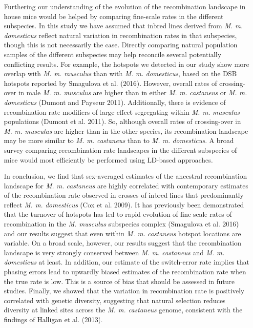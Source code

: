 	Furthering our understanding of the evolution of the recombination landscape in house mice would be helped by comparing fine-scale rates in the different subspecies. In this study we have assumed that inbred lines derived from \textit{M. m. domesticus} reflect natural variation in recombination rates in that subspecies, though this is not necessarily the case. Directly comparing natural population samples of the different subspecies may help reconcile several potentially conflicting results. For example, the hotspots we detected in our study show more overlap with \textit{M. m. musculus} than with \textit{M. m. domesticus}, based on the DSB hotspots reported by Smagulova et al. (2016). However, overall rates of crossing-over in male \textit{M. m. musculus} are higher than in either \textit{M. m. castaneus} or \textit{M. m. domesticus} (Dumont and Payseur 2011). Additionally, there is evidence of recombination rate modifiers of large effect segregating within \textit{M. m. musculus} populations (Dumont et al. 2011). So, although overall rates of crossing-over in \textit{M. m. musculus} are higher than in the other species, its recombination landscape may be more similar to \textit{M. m. castaneus} than to \textit{M. m. domesticus}. A broad survey comparing recombination rate landscapes in the different subspecies of mice would most efficiently be performed using LD-based approaches.  

In conclusion, we find that sex-averaged estimates of the ancestral recombination landscape for \textit{M. m. castaneus} are highly correlated with contemporary estimates of the recombination rate observed in crosses of inbred lines that predominantly reflect \textit{M. m. domesticus} (Cox et al. 2009). It has previously been demonstrated that the turnover of hotspots has led to rapid evolution of fine-scale rates of recombination in the \textit{M. musculus} subspecies complex (Smagulova et al. 2016) and our results suggest that even within \textit{M. m. castaneus} hotspot locations are variable. On a broad scale, however, our results suggest that the recombination landscape is very strongly conserved between \textit{M. m. castaneus} and \textit{M. m. domesticus} at least. In addition, our estimate of the switch-error rate implies that phasing errors lead to upwardly biased estimates of the recombination rate when the true rate is low. This is a source of bias that should be assessed in future studies. Finally, we showed that the variation in recombination rate is positively correlated with genetic diversity, suggesting that natural selection reduces diversity at linked sites across the \textit{M. m. castaneus} genome, consistent with the findings of Halligan et al. (2013). 
  